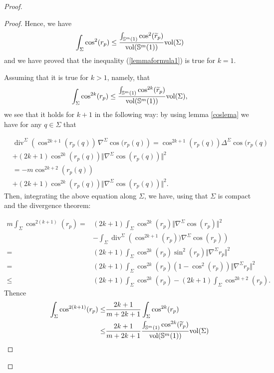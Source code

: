 \documentclass{amsart}
\theoremstyle{definition}
\theoremstyle{remark}
\newcommand{\Div}{\operatorname{div}}
\begin{document}
\begin{proof}
\begin{proof}
Hence,  we have 
\begin{equation}\label{eqsis}
\int_\Sigma \cos^2(r_p) \leq \frac{\int_{\mathbb{S}^m(1)} \cos^2(\widetilde{r}_p)}{{\rm vol}(\mathbb{S}^m(1))} {\rm vol}(\Sigma)
\end{equation}
and we have proved that the inequality (\ref{lemmaformula1}) is true for $k=1$.

Assuming that it is true for $k >1$, namely, that
\begin{equation}\label{eqsisBis}
\int_\Sigma \cos^{2k}(r_p) \leq \frac{\int_{\mathbb{S}^m(1)} \cos^{2k}(\widetilde{r}_p)}{{\rm vol}(\mathbb{S}^m(1))} {\rm vol}(\Sigma),
\end{equation}
we see that it holds for $k+1$ in the following way: by using lemma \ref{coslema}  we have  for any $q\in \Sigma$ that

\begin{equation}
\begin{aligned}
&\Div^\Sigma\left(\cos^{2k+1} (r_p(q))\,\nabla^\Sigma \cos(r_p(q)\right)=\cos^{2k+1}(r_p(q))\Delta^\Sigma\cos(r_p(q)\\&+(2k+1) \cos^{2k}(r_p(q))\Vert \nabla^\Sigma \cos(r_p(q))\Vert^2\\
&=-m\cos^{2k+2}(r_p(q))\\&+(2k+1) \cos^{2k}(r_p(q))\Vert \nabla^\Sigma \cos(r_p(q))\Vert^2.
\end{aligned}
\end{equation}
Then, integrating the above equation  along $\Sigma$, we have, using that $\Sigma$ is compact and the divergence theorem:

\begin{equation}\label{eqdossBis}
\begin{aligned}
m\int_\Sigma \cos^{2(k+1)}(r_p)=&(2k+1)\int_\Sigma\cos^{2k}(r_p)\Vert \nabla^{\Sigma}  \cos(r_p)\Vert^2\\&-\int_\Sigma \Div^\Sigma\left(\cos^{2k+1}(r_p))\nabla^\Sigma \cos(r_p)\right)
\\
=&(2k+1)\int_\Sigma \cos^{2k}(r_p)\sin^2(r_p)\Vert \nabla^{\Sigma} r_p\Vert^2\\
=&(2k+1)\int_\Sigma \cos^{2k}(r_p)\left(1-\cos^2(r_p)\right)\Vert \nabla^{\Sigma} r_p\Vert^2\\
\leq& (2k+1)\int_\Sigma \cos^{2k}(r_p)-(2k+1)\int_\Sigma \cos^{2k+2}(r_p).
\end{aligned}
\end{equation}
Thence
\begin{equation}\label{eqdoss2Bis}
\begin{aligned}
\int_\Sigma \cos^{2(k+1)}(r_p)\leq &\frac{2k+1}{m+2k+1}\int_\Sigma \cos^{2k}(r_p)\\ 
\leq&  \frac{2k+1}{m+2k+1}\frac{\int_{\mathbb{S}^m(1)} \cos^{2k}(\widetilde{r}_p)}{{\rm vol}(\mathbb{S}^m(1))} {\rm vol}(\Sigma)
\end{aligned}
\end{equation}


\end{proof}
\end{proof}
\end{document}
